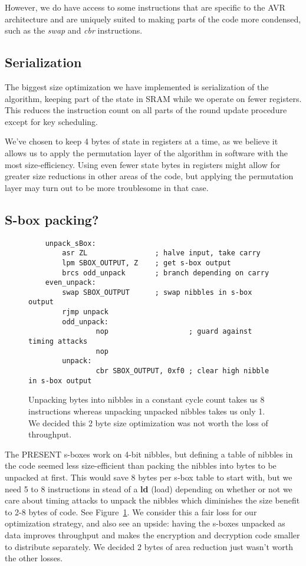 \documentclass{llncs}
\begin{document}
However, we do have access to some instructions that are specific to the AVR architecture and are uniquely suited to making parts of the code more condensed, such as the \textit{swap} and \textit{cbr} instructions.

\subsection{Serialization}
The biggest size optimization we have implemented is serialization of the algorithm, keeping part of the state in SRAM while we operate on fewer registers.
This reduces the instruction count on all parts of the round update procedure except for key scheduling.

We've chosen to keep 4 bytes of state in registers at a time, as we believe it allows us to apply the permutation layer of the algorithm in software with the most size-efficiency.
Using even fewer state bytes in registers might allow for greater size reductions in other areas of the code, but applying the permutation layer may turn out to be more troublesome in that case.

\subsection{S-box packing?}
\begin{figure}
\begin{lstlisting}
	unpack_sBox:
		asr ZL                ; halve input, take carry
		lpm SBOX_OUTPUT, Z    ; get s-box output
		brcs odd_unpack       ; branch depending on carry
	even_unpack:
		swap SBOX_OUTPUT      ; swap nibbles in s-box output
		rjmp unpack
        odd_unpack:
                nop                   ; guard against timing attacks
                nop
        unpack:
                cbr SBOX_OUTPUT, 0xf0 ; clear high nibble in s-box output
	\end{lstlisting}
	\caption{Unpacking bytes into nibbles in a constant cycle count takes us 8 instructions whereas unpacking unpacked nibbles takes us only 1. We decided this 2 byte size optimization was not worth the loss of throughput.}
\label{unpacking_code}
\end{figure}


The PRESENT s-boxes work on 4-bit nibbles, but defining a table of nibbles in the code seemed less size-efficient than packing the nibbles into bytes to be unpacked at first.
This would save 8 bytes per s-box table to start with, but we need 5 to 8 instructions in stead of a \textbf{ld} (load) depending on whether or not we care about timing attacks to unpack the nibbles which diminishes the size benefit to 2-8 bytes of code. See Figure~\ref{unpacking_code}.
We consider this a fair loss for our optimization strategy, and also see an upside: having the s-boxes unpacked as data improves throughput and makes the encryption and decryption code smaller to distribute separately.
We decided 2 bytes of area reduction just wasn't worth the other losses.
\end{document}
